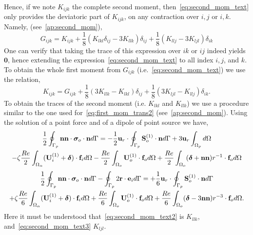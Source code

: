 Hence, if we note $K_{ijk}$ the complete second moment, then~\ref{eq:second_mom_text} only provides the deviatoric part of $K_{ijk}$, on any contraction over $i,j$ or $i,k$. 
Namely, (see~\ref{ap:second_mom}),   
\begin{equation}
    G_{ijk} = K_{ijk}
    +  \frac{1}{8} (K_{lkl}\delta_{ij}  - 3K_{llk})\delta_{ij}  
    + \frac{1}{8} (K_{llj} -3  K_{ljl})\delta_{ik} 
    \label{eq:def_G}
\end{equation}
One can verify that taking the trace of this expression over $ik$ or $ij$ indeed yields $\bm{0}$, hence extending the expression~\ref{eq:second_mom_text} to all index $i,j$, and $k$. 
To obtain the whole first moment from $G_{ijk}$ (i.e.~\ref{eq:second_mom_text}) we use the relation, 
\begin{equation}
    K_{ijk} = G_{ijk}  + \frac{1}{8}(3K_{llk}-K_{lkl}) \delta_{ij} + \frac{1}{8}(3K_{ljl} - K_{llj}) \delta_{ik}. 
    \label{eq:def_K}
\end{equation}
To obtain the traces of the second moment (i.e. $K_{lkl}$ and $K_{llk}$) we use a procedure similar to the one used for~\ref{eq:first_mom_trans2} (see~\ref{ap:second_mom}). 
Using the solution of a point force and of a dipole of point source we have, 
 \begin{multline}
    \frac{1}{2}\intS[p]{\textbf{nn} \cdot  \bm\sigma_{o}\cdot \textbf{n}}
    =
    - \frac{1}{2}
    \textbf{u}_{r}\cdot  \intS[p]{\textbf{S}_{o}^{(1)}\cdot \textbf{n}}
    + 3\textbf{u}_r \intO[p]{}\\
    - \zeta \frac{Re}{2} \intO{(\textbf{U}_{i}^{(1)} + \bm\delta)\cdot \textbf{f}_{i}} 
    - \frac{Re}{2}\intO[o]{\textbf{U}_{o}^{(1)}\cdot \textbf{f}_{o}}
    + \frac{Re}{2}\intO[o]{(\bm\delta + \textbf{nn})r^{-1}\cdot \textbf{f}_{o}}
    \label{eq:second_mom_text2}
\end{multline}
\begin{multline}
    \frac{1}{2}\intS[p]{\textbf{nn} \cdot  \bm\sigma_{o}\cdot \textbf{n}}
    - \intS[p]{2 \textbf{r}\cdot \textbf{e}_i}
    =
    +\frac{1}{6}
    \textbf{u}_{r}\cdot  \intS[p]{\textbf{S}_{o}^{(1)}\cdot \textbf{n}}\\
    + \zeta \frac{Re}{6} \intO{(\textbf{U}_{i}^{(1)} + \bm\delta)\cdot \textbf{f}_{i}} 
    + \frac{Re}{6}\intO[o]{\textbf{U}_{o}^{(1)}\cdot \textbf{f}_{o}}
    + 
    \frac{Re}{6}\intO[o]{(\bm\delta - 3\textbf{nn})r^{-3}\cdot \textbf{f}_{o}}.
    \label{eq:second_mom_text3}
\end{multline}
Here it must be understood that~\ref{eq:second_mom_text2} is $K_{llk}$, and~\ref{eq:second_mom_text3} $K_{ljl}$. 


